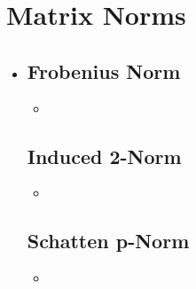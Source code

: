 \section{Matrix Norms}\label{Matrix Norms}
\begin{itemize}
  \item []
  
  \subsection{Frobenius Norm}\label{Frobenius Norm}
  \begin{itemize}
    \item 
  \end{itemize}

  \subsection{Induced 2-Norm}\label{Induced 2-norm}
  \begin{itemize}
    \item 
  \end{itemize}
  
  \subsection{Schatten p-Norm}\label{Schatten Norms}
  \begin{itemize}
    \item 
  \end{itemize}
  
  

\end{itemize}